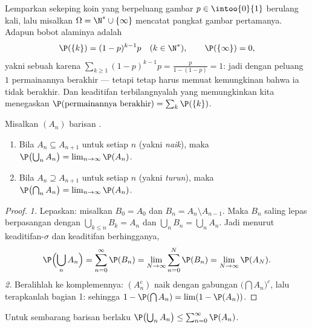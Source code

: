 \begin{example}\label{ex:b2:proba:geometric}
Lemparkan sekeping koin yang berpeluang gambar $p \in \intoo{0}{1}$ berulang kali,
lalu misalkan $\Omega = \N^* \cup \{\infty\}$ mencatat pangkat
gambar pertamanya. Adapun bobot alaminya adalah
\[
\P(\{k\}) = (1 - p)^{k-1}p
\quad (k \in \N^*),
\qquad
\P(\{\infty\}) = 0 ,
\]
yakni sebuah  karena $\sum_{k\geq1}(1-p)^{k-1}p =
\frac{p}{1 - (1-p)} = 1$: jadi dengan peluang $1$ permainannya berakhir ---
tetapi  tetap harus memuat kemungkinan bahwa ia
tidak berakhir. Dan keaditifan terbilangnyalah yang memungkinkan kita menegaskan
$\P(\text{permainannya berakhir}) = \sum_k \P(\{k\})$.
\end{example}

\begin{theorem}\label{thm:b2:proba:continuity}
Misalkan $(A_n)$ barisan .
\begin{enumerate}
\item Bila $A_n \subseteq A_{n+1}$ untuk setiap $n$
(yakni \emph{naik}), maka
$\P\bigl(\bigcup_n A_n\bigr) = \lim_{n\to\infty} \P(A_n)$.
\item Bila $A_n \supseteq A_{n+1}$ untuk setiap $n$
(yakni \emph{turun}), maka
$\P\bigl(\bigcap_n A_n\bigr) = \lim_{n\to\infty} \P(A_n)$.
\end{enumerate}
\end{theorem}

\begin{proof}
\emph{1.} Lepaskan: misalkan $B_0 = A_0$ dan $B_n = A_n \setminus
A_{n-1}$. Maka $B_n$ saling lepas berpasangan dengan $\bigcup_{k \leq n}
B_k = A_n$ dan $\bigcup_n B_n = \bigcup_n A_n$. Jadi menurut
keaditifan-$\sigma$ dan keaditifan berhingganya,
\[
\P\Bigl(\bigcup_n A_n\Bigr)
= \sum_{n=0}^\infty \P(B_n)
= \lim_{N\to\infty}\sum_{n=0}^N \P(B_n)
= \lim_{N\to\infty}\P(A_N) .
\]
\emph{2.} Beralihlah ke komplemennya: $(A_n^c)$ naik dengan gabungan
$\bigl(\bigcap A_n\bigr)^c$, lalu terapkanlah bagian 1:
sehingga $1 - \P(\bigcap A_n) = \lim (1 - \P(A_n))$.
\end{proof}

\begin{corollary}\label{cor:b2:proba:subadd}
Untuk sembarang barisan  berlaku $\P\bigl(\bigcup_n A_n\bigr) \leq
\sum_{n=0}^\infty \P(A_n)$.
\end{corollary}

